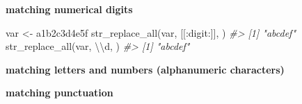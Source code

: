 \documentclass[
]{book}
\newenvironment{Shaded}{\begin{snugshade}}{\end{snugshade}}
\newcommand{\CommentTok}[1]{\textcolor[rgb]{0.56,0.35,0.01}{\textit{#1}}}
\newcommand{\FunctionTok}[1]{\textcolor[rgb]{0.00,0.00,0.00}{#1}}
\newcommand{\NormalTok}[1]{#1}
\newcommand{\OtherTok}[1]{\textcolor[rgb]{0.56,0.35,0.01}{#1}}
\newcommand{\SpecialCharTok}[1]{\textcolor[rgb]{0.00,0.00,0.00}{#1}}
\newcommand{\StringTok}[1]{\textcolor[rgb]{0.31,0.60,0.02}{#1}}
\begin{document}
\textbf{matching numerical digits}

\begin{Shaded}
\begin{Highlighting}[]
\NormalTok{var }\OtherTok{\textless{}{-}} \StringTok{\textquotesingle{}a1b2c3d4e5f\textquotesingle{}}
\FunctionTok{str\_replace\_all}\NormalTok{(var, }\StringTok{\textquotesingle{}[[:digit:]]\textquotesingle{}}\NormalTok{, }\StringTok{\textquotesingle{}\textquotesingle{}}\NormalTok{)}
\CommentTok{\#\textgreater{} [1] "abcdef"}
\FunctionTok{str\_replace\_all}\NormalTok{(var, }\StringTok{\textquotesingle{}}\SpecialCharTok{\textbackslash{}\textbackslash{}}\StringTok{d\textquotesingle{}}\NormalTok{, }\StringTok{\textquotesingle{}\textquotesingle{}}\NormalTok{)}
\CommentTok{\#\textgreater{} [1] "abcdef"}
\end{Highlighting}
\end{Shaded}

\textbf{matching letters and numbers (alphanumeric characters)}

\begin{Shaded}
\end{Shaded}

\textbf{matching punctuation}
\end{document}
